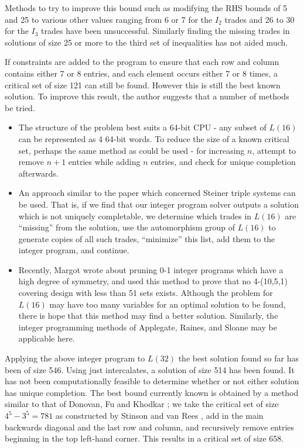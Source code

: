 \documentclass{article}
\begin{document}
Methods to try to improve this bound such as modifying the RHS
bounds of 5 and 25 to various other values ranging from 6 or 7 for
the $I_2$ trades and 26 to 30 for the $I_3$ trades have been
unsuccessful. Similarly finding the missing trades in solutions of
size 25 or more to the third set of inequalities has not aided
much.

If constraints are added to the program to ensure that each
row and column contains either 7 or 8 entries, and each element
occurs either 7 or 8 times, a critical set of size 121 can
still be found.  However this is still the best known solution.
To improve this result, the author suggests that a number of methods
be tried.

\begin{itemize}
\item The structure of the problem best suits a 64-bit CPU - any
subset of $L(16)$ can be represented as 4 64-bit words.  To reduce
the size of a known critical set, perhaps the same method as
\cite{closing} could be used - for increasing $n$, attempt to
remove $n+1$ entries while adding $n$ entries, and check for
unique completion afterwards.

\item An approach similar to the paper \cite{sts} which concerned
Steiner triple systems can be used.  That is, if we find that our
integer program solver outputs a solution which is not uniquely
completable, we determine which trades in $L(16)$ are ``missing''
from the solution, use the automorphism group of $L(16)$ to
generate copies of all such trades, ``minimize'' this list, add
them to the integer program, and continue.

\item Recently, Margot \cite{margot} wrote about pruning 0-1
integer programs which have a high degree of symmetry, and used
this method to prove that no 4-(10,5,1) covering design with less
than 51 sets exists.  Although the problem for $L(16)$ may have
too many variables for an optimal solution to be found, there is
hope that this method may find a better solution.  Similarly, the
integer programming methods of Applegate, Raines, and Sloane
\cite{apple} may be applicable here.
\end{itemize}

Applying the above integer program to $L(32)$ the best solution
found so far has been of size 546.  Using just intercalates, a
solution of size 514 has been found.  It has not been
computationally feasible to determine whether or not either
solution has unique completion.  The best bound currently known is
obtained by a method similar to that of Donovan, Fu and Khodkar
\cite{dfk}; we take the critical set of size $4^5-3^5=781$ as
constructed by Stinson and van Rees \cite{svr}, add in the main
backwards diagonal and the last row and column, and recursively
remove entries beginning in the top left-hand corner.  This
results in a critical set of size 658.
\end{document}

